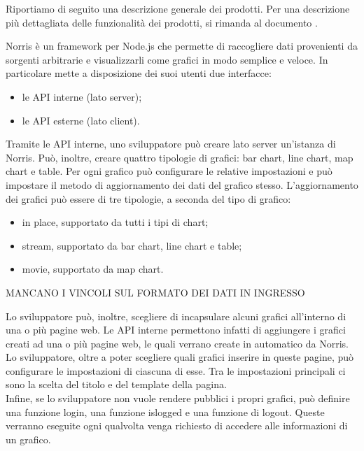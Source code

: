     Riportiamo di seguito una descrizione generale dei prodotti. Per una descrizione più dettagliata delle funzionalità dei prodotti, si rimanda al documento .

    Norris è un framework per Node.js che permette di raccogliere dati provenienti da sorgenti arbitrarie e visualizzarli come grafici in modo semplice e veloce. In particolare mette a disposizione dei suoi utenti due interfacce:
    \begin{itemize}
        \item le API interne (lato server);
        \item le API esterne (lato client).
    \end{itemize}
    
    Tramite le API interne, uno sviluppatore può creare lato server un'istanza di Norris. Può, inoltre, creare quattro tipologie di grafici: bar chart, line chart, map chart e table. Per ogni grafico può configurare le relative impostazioni e può impostare il metodo di aggiornamento dei dati del grafico stesso. L'aggiornamento dei grafici può essere di tre tipologie, a seconda del tipo di grafico:
    \begin{itemize}
        \item in place, supportato da tutti i tipi di chart;
        \item stream, supportato da bar chart, line chart e table;
        \item movie, supportato da map chart.
    \end{itemize}
    
    MANCANO I VINCOLI SUL FORMATO DEI DATI IN INGRESSO
    
    Lo sviluppatore può, inoltre, scegliere di incapsulare alcuni grafici all'interno di una o più pagine web. Le API interne permettono infatti di aggiungere i grafici creati ad una o più pagine web, le quali verrano create in automatico da Norris. Lo sviluppatore, oltre a poter scegliere quali grafici inserire in queste pagine, può configurare le impostazioni di ciascuna di esse. Tra le impostazioni principali ci sono la scelta del titolo e del template della pagina.\\
    Infine, se lo sviluppatore non vuole rendere pubblici i propri grafici, può definire una funzione login, una funzione islogged e una funzione di logout. Queste verranno eseguite ogni qualvolta venga richiesto di accedere alle informazioni di un grafico.
   
